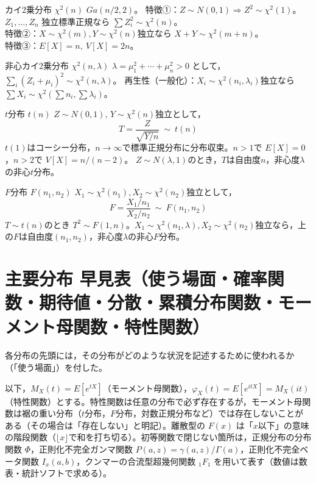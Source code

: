 \documentclass[a4paper,11pt]{ltjsarticle}
\begin{document}
\begin{term}{カイ2乗分布 $\chi^2(n)$}
$Ga(n/2,2)$。
特徴①：$Z\sim N(0,1)\Rightarrow Z^2\sim\chi^2(1)$。$Z_1,\dots,Z_n$ 独立標準正規なら $\sum Z_i^2\sim\chi^2(n)$。\\
特徴②：$X\sim\chi^2(m),Y\sim\chi^2(n)$独立なら $X+Y\sim\chi^2(m+n)$。\\
特徴③：$E[X]=n,\ V[X]=2n$。
\end{term}

\begin{term}{非心カイ2乗分布 $\chi^2(n,\lambda)$}
$\lambda=\mu_1^2+\cdots+\mu_n^2>0$ として，$\sum_i(Z_i+\mu_i)^2\sim\chi^2(n,\lambda)$。
再生性（一般化）：$X_i\sim\chi^2(n_i,\lambda_i)$独立なら $\sum X_i\sim\chi^2\!\left(\sum n_i,\sum\lambda_i\right)$。
\end{term}

\begin{term}{$t$分布 $t(n)$}
$Z\sim N(0,1),\,Y\sim\chi^2(n)$独立として，
\[
T=\frac{Z}{\sqrt{Y/n}}\ \sim\ t(n)
\]
$t(1)$はコーシー分布，$n\to\infty$で標準正規分布に分布収束。$n>1$で $E[X]=0$，$n>2$で $V[X]=n/(n-2)$。
$Z\sim N(\lambda,1)$のとき，$T$は自由度$n$，非心度$\lambda$の非心$t$分布。
\end{term}

\begin{term}{$F$分布 $F(n_1,n_2)$}
$X_1\sim\chi^2(n_1),X_2\sim\chi^2(n_2)$独立として，
\[
F=\frac{X_1/n_1}{X_2/n_2}\ \sim\ F(n_1,n_2)
\]
$T\sim t(n)$のとき $T^2\sim F(1,n)$。$X_1\sim\chi^2(n_1,\lambda),X_2\sim\chi^2(n_2)$独立なら，上の$F$は自由度$(n_1,n_2)$，非心度$\lambda$の非心$F$分布。
\end{term}

\section{主要分布 早見表（使う場面・確率関数・期待値・分散・累積分布関数・モーメント母関数・特性関数）}

各分布の先頭には，その分布がどのような状況を記述するために使われるか（「使う場面」）を付した。

以下，$M_X(t)=E[e^{tX}]$（モーメント母関数），$\varphi_X(t)=E[e^{itX}]=M_X(it)$（特性関数）とする。特性関数は任意の分布で必ず存在するが，モーメント母関数は裾の重い分布（$t$分布，$F$分布，対数正規分布など）では存在しないことがある（その場合は「存在しない」と明記）。離散型の $F(x)$ は「$x$以下」の意味の階段関数（$\lfloor x\rfloor$で和を打ち切る）。初等関数で閉じない箇所は，正規分布の分布関数 $\Phi$，正則化不完全ガンマ関数 $P(a,z)=\gamma(a,z)/\Gamma(a)$，正則化不完全ベータ関数 $I_x(a,b)$，クンマーの合流型超幾何関数 ${}_1F_1$ を用いて表す（数値は数表・統計ソフトで求める）。
\end{document}
